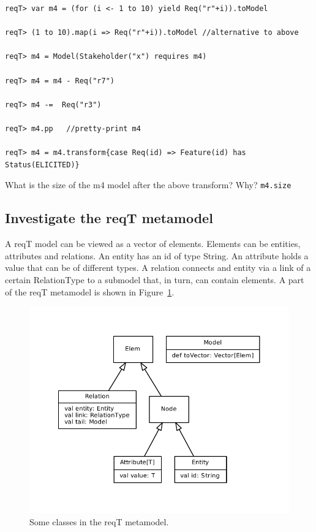 \documentclass[11pt]{article}
\begin{document}
\begin{framed}
{\scriptsize\begin{verbatim}
reqT> var m4 = (for (i <- 1 to 10) yield Req("r"+i)).toModel

reqT> (1 to 10).map(i => Req("r"+i)).toModel //alternative to above

reqT> m4 = Model(Stakeholder("x") requires m4)

reqT> m4 = m4 - Req("r7")

reqT> m4 -=  Req("r3")

reqT> m4.pp   //pretty-print m4

reqT> m4 = m4.transform{case Req(id) => Feature(id) has Status(ELICITED)}
\end{verbatim}}
\end{framed}
\begin{framed}\noindent
What is the size of the m4 model after the above transform? Why?
\newline
\verb+m4.size+
\newline
\newline \underline{\hspace{10cm}}
\end{framed}

\subsection{Investigate the reqT metamodel}

A reqT model can be viewed as a vector of elements. Elements can be entities, attributes and relations. An entity has an id of type String. An attribute holds a value that can be of different types. A relation connects and entity via a link of a certain RelationType to a submodel that, in turn, can contain elements. A part of the reqT metamodel is shown in Figure~\ref{fig:metamodel}. 

\begin{figure}[h]
    \centering
    \includegraphics[width=\textwidth]{metamodel-simple.pdf}
    \caption{Some classes in the reqT metamodel.}
    \label{fig:metamodel}
\end{figure}
\end{document}

